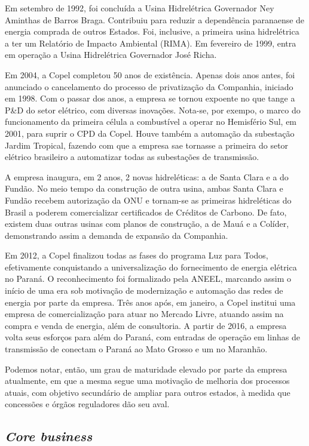 \documentclass[grad,numbers]{coppe}
\begin{document}
  Em setembro de 1992, foi concluída a Usina Hidrelétrica Governador Ney Aminthas de Barros Braga. Contribuiu para reduzir a dependência paranaense de energia comprada de outros Estados. Foi, inclusive, a primeira usina hidrelétrica a ter um Relatório de Impacto Ambiental (RIMA). Em fevereiro de 1999, entra em operação a Usina Hidrelétrica Governador José Richa.

  Em 2004, a Copel completou 50 anos de existência. Apenas dois anos antes, foi anunciado o cancelamento do processo de privatização da Companhia, iniciado em 1998. Com o passar dos anos, a empresa se tornou expoente no que tange a P\&D do setor elétrico, com diversas inovações. Nota-se, por exempo, o marco do funcionamento da primeira célula a combustível a operar no Hemisfério Sul, em 2001, para suprir o CPD da Copel. Houve também a automação da subestação Jardim Tropical, fazendo com que a empresa sae tornasse a primeira do setor elétrico brasileiro a automatizar todas as subestações de transmissão.

  A empresa inaugura, em 2 anos, 2 novas hidreléticas: a de Santa Clara e a do Fundão. No meio tempo da construção de outra usina, ambas Santa Clara e Fundão recebem autorização da ONU e tornam-se as primeiras hidreléticas do Brasil a poderem comercializar certificados de Créditos de Carbono. De fato, existem duas outras usinas com planos de construção, a de Mauá e a Colíder, demonstrando assim a demanda de expansão da Companhia.

  Em 2012, a Copel finalizou todas as fases do programa Luz para Todos, efetivamente conquistando a universalização do fornecimento de energia elétrica no Paraná. O reconhecimento foi formalizado pela ANEEL, marcando assim o início de uma era sob motivação de modernização e automação das redes de energia por parte da empresa. Três anos após, em janeiro, a Copel institui uma empresa de comercialização para atuar no Mercado Livre, atuando assim na compra e venda de energia, além de consultoria. A partir de 2016, a empresa volta seus esforços para além do Paraná, com entradas de operação em linhas de transmissão de conectam o Paraná ao Mato Grosso e um no Maranhão.

  Podemos notar, então, um grau de maturidade elevado por parte da empresa atualmente, em que a mesma segue uma motivação de melhoria dos processos atuais, com objetivo secundário de ampliar para outros estados, à medida que concessões e órgãos reguladores dão seu aval.

  \hypertarget{core-business}{%
  \subsection{\texorpdfstring{\emph{Core business}}{Core business}}\label{core-business}}
\end{document}
